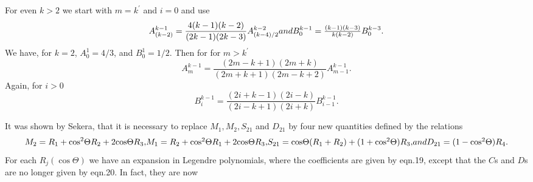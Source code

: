 \documentclass[12pt]{article}
\begin{document}
For even $k>2$ we start with $m=k^\prime$ and $i=0$ and use
\begin{equation}
A_{(k-2)}^{k-1}=\frac{4(k-1)(k-2)}{(2k-1)(2k-3)}A_{(k-4)/2}^{k-2}
$$ and   $$
B_0^{k-1}=\frac{(k-1)(k-3)}{k(k-2)} B_0^{k-3}.
\end{equation}
We have, for $k=2$,  $A_0^1=4/3$, and $B_0^1=1/2$. Then for for $m>k^\prime$
\begin{equation}
A^{k-1}_m= \frac{(2m-k+1)(2m+k)}{(2m+k+1)(2m -k+2)}A_{m-1}^{k-1}.
\end{equation}
Again, for $i>0$
\begin{equation}
B_i^{k-1}=\frac{(2i+k-1)(2i-k)}{(2i-k+1)(2i+k)}B_{i-1}^{k-1}.
\end{equation}


It was shown by Sekera, that it is necessary to replace $M_1, M_2, S_{21}$ and $D_{21}$
 by four new quantities defined by the relations
\begin{equation}
M_2=R_1+ {\cos}^2 \Theta R_2 +2 {\cos}\Theta R_3,
$$    $$
M_1=R_2+ {\cos}^2 \Theta R_1 +2 {\cos}\Theta R_3,
$$   $$
S_{21}={\cos} \Theta ( R_1+  R_2) +(1+ {\cos}^2\Theta) R_3,
$$   and $$
D_{21}=(1- {\cos}^2\Theta) R_4.
\end{equation}
For each $R_j({\cos} \Theta)$ we have an expansion in Legendre polynomials, where the coefficients are given by eqn.19, except that the $C$s and $D$s are no longer given by eqn.20. In fact, they are now
\end{document}
